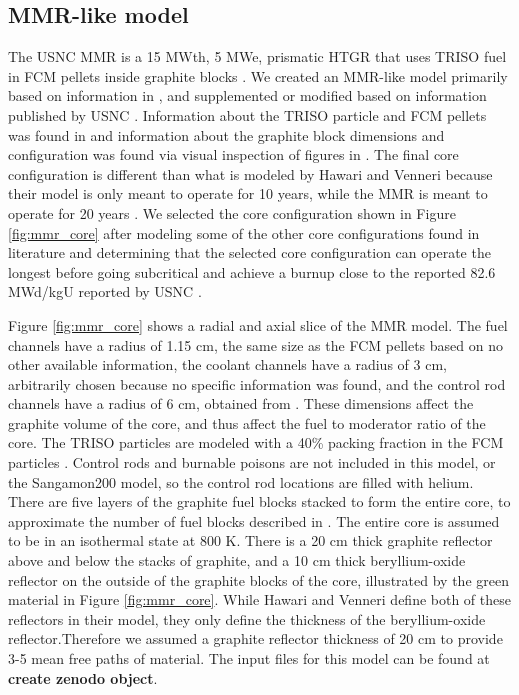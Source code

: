 \subsection{MMR-like model}
The \gls{USNC} \gls{MMR} is a 15 MWth, 5 MWe, prismatic \gls{HTGR} that 
uses \gls{TRISO} fuel in \acrfull{FCM} pellets inside graphite blocks 
\cite{noauthor_usnc_2021}.
We created an \gls{MMR}-like model primarily based on information in 
\cite{hawari_development_2018}, and supplemented or modified based on 
information published by \gls{USNC} \cite{noauthor_usnc_2021}. 
Information about the \gls{TRISO} 
particle and \gls{FCM} pellets was found in \cite{noauthor_usnc_2021}
and information about the graphite block dimensions and configuration 
was found via visual inspection of figures in \cite{venneri_micro_2019}. 
The final core configuration 
is different than what is modeled by Hawari and Venneri \cite{hawari_development_2018} 
because their model is only meant to operate 
for 10 years, while the \gls{MMR} is meant to operate for 20 years 
\cite{noauthor_usnc_2021}. We selected the core configuration shown in 
Figure \ref{fig:mmr_core} after modeling some of the other core 
configurations found in literature \cite{mitchell_usnc_2020,hawari_development_2018}
and determining that the selected core configuration  
can operate the longest before going subcritical and 
achieve a burnup close to the reported 82.6 MWd/kgU reported by 
\gls{USNC} \cite{noauthor_usnc_2021}. 

Figure \ref{fig:mmr_core} shows a radial and axial slice of the 
\gls{MMR} model. The fuel channels have a radius of 1.15 cm, the same
size as the \gls{FCM} pellets based on no other available information, 
the coolant channels have a radius of 
3 cm, arbitrarily chosen because no specific information was found, 
and the control rod channels have a radius of 6 cm, obtained from 
\cite{hawari_development_2018}. These dimensions affect the graphite volume 
of the core, and thus affect the fuel to moderator ratio of the core. 
The \gls{TRISO} particles are modeled with a 40\% packing fraction in 
the \gls{FCM} particles \cite{powers_fully_2014}.
Control rods and burnable poisons are not included in this model, or 
the Sangamon200 model, so the control rod locations are filled with helium.
There are five layers of the graphite fuel blocks 
stacked to form the entire core, to approximate the number of 
fuel blocks described in \cite{noauthor_usnc_2021}. The entire core 
is assumed to be in an isothermal state at 800 K. There is a 20 cm 
thick graphite reflector above and below the stacks of graphite, 
and a 10 cm thick beryllium-oxide reflector on the outside of the 
graphite blocks of the core, illustrated by the green material in 
Figure \ref{fig:mmr_core}. While Hawari and Venneri \cite{hawari_development_2018}
define both of these reflectors in their model, they only 
define the thickness of the beryllium-oxide reflector.Therefore we 
assumed a graphite reflector thickness of 20 cm to provide 3-5 mean 
free paths of material. 
The input files for this model can be found at \textbf{create zenodo 
object}.

